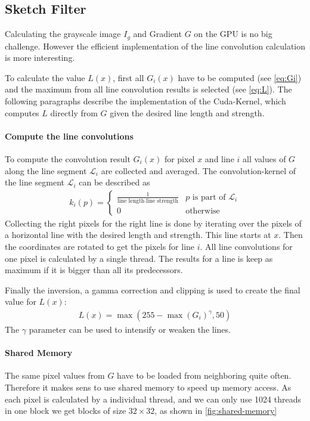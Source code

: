 \subsection{Sketch Filter}
Calculating the grayscale image $I_g$ and Gradient $G$ on the GPU is no big
challenge. However the efficient implementation of the line convolution
calculation is more interesting.

To calculate the value $L(x)$, first all $G_i(x)$ have to
be computed (see \autoref{eq:Gi}) and the maximum from all line convolution
results is selected (see \autoref{eq:L}). The following paragraphs describe the
implementation of the Cuda-Kernel, which computes $L$ directly from $G$ given
the desired line length and strength.

\paragraph{Compute the line convolutions} 
To compute the convolution result $G_i(x)$ for pixel $x$ and line $i$ all values of $G$
along the line segment $\mathscr{L}_i$ are collected and averaged. The
convolution-kernel of the line segment $\mathscr{L}_i$ can be described as 
\begin{align*}
  k_i(p) = \begin{cases}
    \frac{1}{\text{line length} \cdot \text{line strength}} & p \text{ is part
    of } \mathscr{L}_i\\
    0 & \text{otherwise}
  \end{cases}
\end{align*}
Collecting the right pixels for the right line is done by iterating over the
pixels of a horizontal line with the desired length and strength. This line
starts at $x$. Then the coordinates are rotated to get the pixels for line $i$.
All line convolutions for one pixel is calculated by a single thread. The
results for a line is keep as maximum if it is bigger than all its predecessors. 

Finally the inversion, a gamma correction and clipping is used to create the
final value for $L(x)$:
\begin{align*}
  L(x) = \max(255 - \max(G_i)^{\gamma}, 50)
\end{align*}
The $\gamma$ parameter can be used to intensify or weaken the lines.

\paragraph{Shared Memory}
The same pixel values from $G$ have to be loaded from neighboring quite often.
Therefore it makes sens to use shared memory to speed up memory access.
As each pixel is calculated by a individual thread, and we can only use 1024
threads in one block we get blocks of size $32\times32$, as shown in
\autoref{fig:shared-memory}

